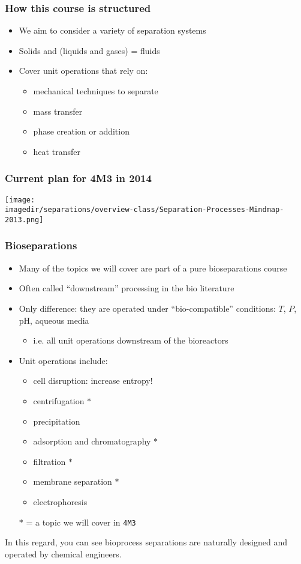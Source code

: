 \begin{frame}\frametitle{How this course is structured}
	\begin{itemize}
		\item	We aim to consider a variety of separation systems
		\item	Solids and (liquids and gases) = fluids
		\item	Cover unit operations that rely on:
		\begin{itemize}
			\item	mechanical techniques to separate
			\item	mass transfer
			\item	phase creation or addition
			\item	heat transfer
		\end{itemize}
	\end{itemize}
\end{frame}

\begin{frame}\frametitle{Current plan for 4M3 in 2014}
	\begin{center}
		\texttt{[image: \\imagedir/separations/overview-class/Separation-Processes-Mindmap-2013.png]}
	\end{center}
\end{frame}

\begin{frame}\frametitle{Bioseparations}
	\begin{itemize}
		\item	Many of the topics we will cover are part of a pure bioseparations course
		\item	Often called ``downstream'' processing in the bio literature
		\item	Only difference: they are operated under ``bio-compatible'' conditions: $T$, $P$, pH, aqueous media
		\begin{itemize}
			\item	i.e. all unit operations downstream of the bioreactors
		\end{itemize}
		\item	Unit operations include:
		\begin{itemize}
			\item	cell disruption: increase entropy!
			\item	centrifugation $\ast$
			\item	precipitation
			\item	adsorption and chromatography $\ast$
			\item	filtration $\ast$
			\item	membrane separation $\ast$
			\item	electrophoresis
		\end{itemize}
		\vspace{12pt}
		$\ast$ = a topic we will cover in \texttt{4M3}
	\end{itemize}
	\vspace{12pt}
	In this regard, you can see bioprocess separations are naturally designed and operated by chemical engineers.
\end{frame}

